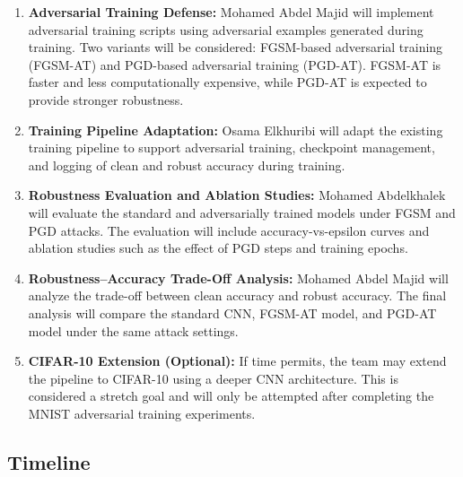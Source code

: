 \documentclass[conference,10pt]{IEEEtran}
\begin{document}
\begin{enumerate}
    \item \textbf{Adversarial Training Defense:}
    Mohamed Abdel Majid will implement adversarial training scripts using adversarial examples generated during training. Two variants will be considered: FGSM-based adversarial training (FGSM-AT) and PGD-based adversarial training (PGD-AT). FGSM-AT is faster and less computationally expensive, while PGD-AT is expected to provide stronger robustness.

    \item \textbf{Training Pipeline Adaptation:}
    Osama Elkhuribi will adapt the existing training pipeline to support adversarial training, checkpoint management, and logging of clean and robust accuracy during training.

    \item \textbf{Robustness Evaluation and Ablation Studies:}
    Mohamed Abdelkhalek will evaluate the standard and adversarially trained models under FGSM and PGD attacks. The evaluation will include accuracy-vs-epsilon curves and ablation studies such as the effect of PGD steps and training epochs.

    \item \textbf{Robustness--Accuracy Trade-Off Analysis:}
    Mohamed Abdel Majid will analyze the trade-off between clean accuracy and robust accuracy. The final analysis will compare the standard CNN, FGSM-AT model, and PGD-AT model under the same attack settings.

    \item \textbf{CIFAR-10 Extension (Optional):}
    If time permits, the team may extend the pipeline to CIFAR-10 using a deeper CNN architecture. This is considered a stretch goal and will only be attempted after completing the MNIST adversarial training experiments.
\end{enumerate}


\subsection{Timeline}
\vspace{-0.2cm}
\end{document}
